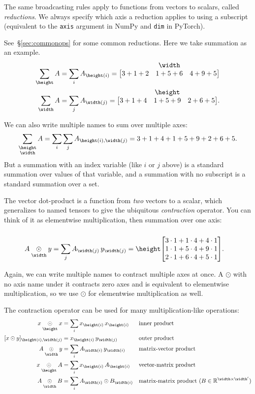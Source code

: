 \documentclass{article}
\makeatletter
\newcommand{\nmatrix}[3]{#1\begin{array}[b]{@{}c@{}}#2\\\begin{bmatrix}#3\end{bmatrix}\end{array}}
\newcommand{\reals}{\mathbb{R}}
\makeatother
\begin{document}
The same broadcasting rules apply to functions from vectors to scalars, called \emph{reductions}. We always specify which axis a reduction applies to using a subscript (equivalent to the \verb|axis| argument in NumPy and \verb|dim| in PyTorch).

See~\S\ref{sec:commonops} for some common reductions. Here we take summation as an example.
\begin{align*}
\nsum{\height} A &= \sum_i A_{\height(i)} = \nmatrix{}{\width}{
  3+1+2 & 1+5+6 & 4+9+5
}
\\
\nsum{\width} A &= \sum_j A_{\width(j)} = \nmatrix{}{\height}{
  3+1+4 & 1+5+9 & 2+6+5
}.
\end{align*}

We can also write multiple names to sum over multiple axes:
\begin{equation*}
  \nsum{\height \\ \width} A = \sum_i \sum_j A_{\height(i),\width(j)} = 3+1+4+1+5+9+2+6+5.
\end{equation*}
But a summation with an index variable (like $i$ or $j$ above) is a standard summation over values of that variable, and a summation with no subscript is a standard summation over a set.

The vector dot-product is a function from \emph{two} vectors to a scalar, which generalizes to named tensors to give the ubiquitous \emph{contraction} operator. You can think of it as elementwise multiplication, then summation over one axis:
\begin{align*}
A \ndot{\width} y &= \sum_j A_{\width(j)} \, y_{\width(j)} = \nmatrix{\height}{}{
  3\cdot1 + 1\cdot4 + 4\cdot1 \\
  1\cdot1 + 5\cdot4 + 9\cdot1 \\
  2\cdot1 + 6\cdot4 + 5\cdot1
}.
\end{align*}

Again, we can write multiple names to contract multiple axes at once. A $\odot$ with no axis name under it contracts zero axes and is equivalent to elementwise multiplication, so we use $\odot$ for elementwise multiplication as well.

The contraction operator can be used for many multiplication-like operations:
\begin{align*}
  x \ndot{\height} x &= \sum_i x_{\height(i)} \, x_{\height(i)} && \text{inner product} \\
  [x \odot y]_{\height(i), \width(j)} &= x_{\height(i)} \, y_{\width(j)} && \text{outer product} \\
  A \ndot{\width} y &= \sum_i A_{\width(i)} \, y_{\width(i)} && \text{matrix-vector product} \\
  x \ndot{\height} A &= \sum_i x_{\height(i)} \, A_{\height(i)} && \text{vector-matrix product} \\
  A \ndot{\width} B &= \sum_i A_{\width(i)} \odot B_{\width(i)} && \text{matrix-matrix product}~(B \in \reals^{\width \times \width'})
\end{align*}
\end{document}
